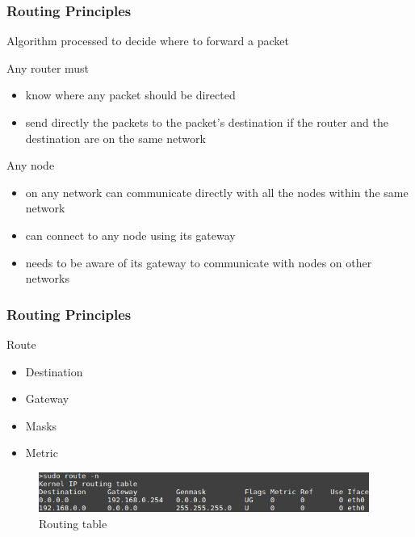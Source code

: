   \begin{frame}
    \frametitle{Routing Principles}
    Algorithm processed to decide where to forward a packet
	\begin{block}{Any router must}
	  \begin{itemize}
	    \item know where any packet should be directed
	    \item send directly the packets to the packet's destination if the router and the destination are on the same network
	  \end{itemize}
        \end{block}
	\begin{block}{Any node}
	  \begin{itemize}
	    \item on any network can communicate directly with all the nodes within the same network
	    \item can connect to any node using its gateway
	    \item needs to be aware of its gateway to communicate with nodes on other networks
	  \end{itemize}
        \end{block}
  \end{frame}

  \begin{frame}
    \frametitle{Routing Principles}
	\begin{block}{Route}
	  \begin{itemize}
	    \item Destination
	    \item Gateway
	    \item Masks
	    \item Metric
	  \end{itemize}
        \end{block}
        \pause
	\begin{figure}[t]
          \centering
          \includegraphics[height=1.3cm]{./imgs/routing-table.png}
          \caption{Routing table}
          \label{fig:routing_table}
        \end{figure}
  \end{frame}

